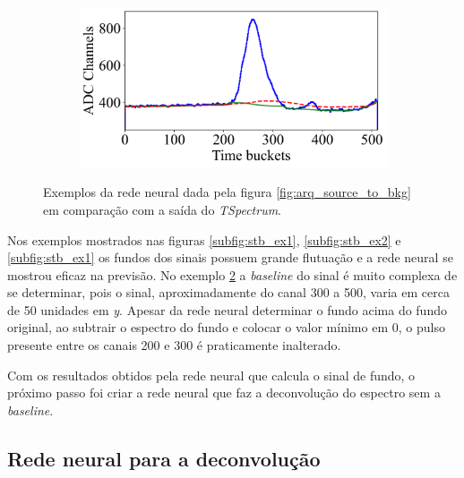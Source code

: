 \documentclass[a4paper,12pt,oneside]{book}
\begin{document}
\begin{figure}[H]
\begin{subfigure}[b]{0.47\textwidth}
        \caption{}
        \label{subfig:stb_ex3}
    \end{subfigure}%
    \hfill
    \begin{subfigure}[b]{0.46\textwidth}
        \centering
        \includegraphics[scale=0.43]{figs/stb_4.png}
        \caption{}
        \label{subfig:stb_ex4}
    \end{subfigure}
\caption{Exemplos da rede neural dada pela figura \ref{fig:arq_source_to_bkg} em comparação com a saída do \textit{TSpectrum}.}
\label{fig:stb_examples}
\end{figure}

\par Nos exemplos mostrados nas figuras \ref{subfig:stb_ex1}, \ref{subfig:stb_ex2} e \ref{subfig:stb_ex1} os fundos dos sinais possuem grande flutuação e a rede neural se mostrou eficaz na previsão. No exemplo \ref{subfig:stb_ex4} a \textit{baseline} do sinal é muito complexa de se determinar, pois o sinal, aproximadamente do canal 300 a 500, varia em cerca de 50 unidades em \textit{y}. Apesar da rede neural determinar o fundo acima do fundo original, ao subtrair o espectro do fundo e colocar o valor mínimo em 0, o pulso presente entre os canais 200 e 300 é praticamente inalterado.

\par Com os resultados obtidos pela rede neural que calcula o sinal de fundo, o próximo passo foi criar a rede neural que faz a deconvolução do espectro sem a \textit{baseline}.

\subsection{Rede neural para a deconvolução}\label{subsec:pulso_ml_deconv}

\end{document}

